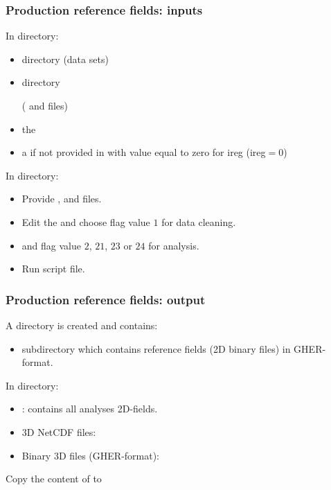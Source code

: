 \begin{frame}
\frametitle{Production reference fields: inputs}

\centerline{In  directory:}
\begin{itemize}
\item {} directory (data sets)
\item {} directory \par ( and  files)
\item the 
\item a  if not provided in  with value equal to zero for ireg (ireg$=0$)
\end{itemize}

\centerline{In  directory:}
\begin{itemize}
\item Provide ,  and  files.
\item Edit the  and choose flag value $1$ for data cleaning.
\item and flag value $2$, $21$, $23$ or $24$ for analysis.
\item Run  script file.
\end{itemize}

\end{frame}



\begin{frame}
\frametitle{Production reference fields: output}

\centerline{\Large{A  directory is created and contains:}}
\small{
\begin{itemize}
\item {} subdirectory which contains reference fields (\diva 2D binary files) in GHER-format.
\end{itemize}
}

\centerline{\Large{In  directory:}}


\small{
\begin{itemize}
\item {}: contains all \diva analyses 2D-fields.
\item 3D NetCDF files:\par {}
\item Binary 3D files (GHER-format):\par {}
\end{itemize}
}


\centerline{\Large{Copy the content of  to}}

\centerline{\Large{}}

\end{frame}


